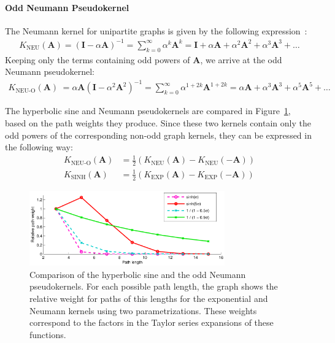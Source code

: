 \documentclass[11pt,a4paper]{book}
\newcommand{\wOnePointFive}{0.75}
\begin{document}
\paragraph{Odd Neumann Pseudokernel}
The Neumann kernel for unipartite graphs is given by the following
expression~\cite{b137}:
\begin{align*}
  K_\mathrm{NEU} (\mathbf A) = (\mathbf I - \alpha \mathbf A)^{-1} =
  \sum_{k=0}^\infty \alpha^k \mathbf A^k   
  = \mathbf I + \alpha \mathbf A + \alpha^2 \mathbf A^2 + \alpha^3
  \mathbf A^3 + \ldots 
\end{align*}
Keeping only the terms containing odd powers of $\mathbf A$, we arrive
at the odd Neumann pseudokernel:
\begin{align}
  K_\textrm{NEU-O} (\mathbf A) &= \alpha \mathbf A (\mathbf I - \alpha^2
  \mathbf A^2)^{-1} = 
  \sum_{k=0}^\infty \alpha^{1+2k} \mathbf A^{1+2k} 
  = \alpha \mathbf A + \alpha^3 \mathbf A^3 + \alpha^5 \mathbf A^5 + \ldots 
  \label{eq:odd-neumann-pseudokernel}
\end{align}

The hyperbolic sine and Neumann pseudokernels are compared in
Figure~\ref{fig:bar}, based on the path weights they produce. 
Since these two kernels contain only the odd powers of the corresponding
non-odd graph kernels, they can be expressed in the following way:
\begin{align}
  K_\textrm{NEU-O}(\mathbf A) &= 
  \frac 12 \left(K_\mathrm{NEU}(\mathbf A) - K_\mathrm{NEU}(-\mathbf
  A)\right) \\
  K_\mathrm{SINH}(\mathbf A) &= 
  \frac 12 \left(K_\mathrm{EXP}(\mathbf A) - K_\mathrm{EXP}(-\mathbf
  A)\right)
\end{align}

\begin{figure}[h!]
  \centering
  \includegraphics[width=\wOnePointFive\textwidth]{img-hs-ps/bar}
  \caption{
    Comparison of the hyperbolic sine and the odd Neumann pseudokernels.
    For each possible path length, the graph shows the relative weight
    for paths of this lengths for the exponential and Neumann kernels
    using two parametrizations.  These weights correspond to the factors
    in the Taylor series expansions of these functions.
  }
  \label{fig:bar}
\end{figure}
\end{document}
